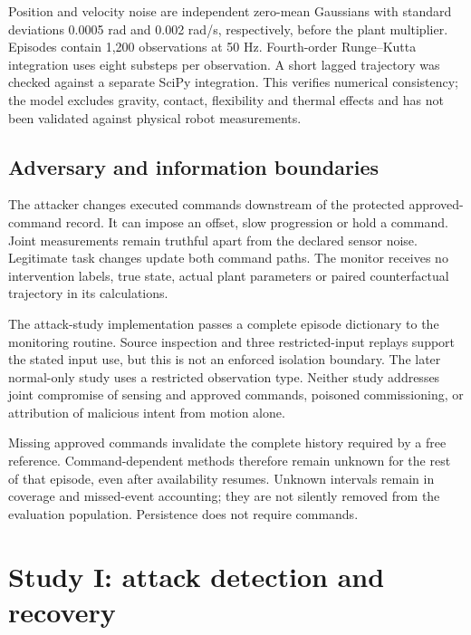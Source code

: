 \documentclass[11pt]{article}
\begin{document}
Position and velocity noise are independent zero-mean Gaussians with standard deviations 0.0005 rad and 0.002 rad/s, respectively, before the plant multiplier. Episodes contain 1,200 observations at 50 Hz. Fourth-order Runge--Kutta integration uses eight substeps per observation. A short lagged trajectory was checked against a separate SciPy integration. This verifies numerical consistency; the model excludes gravity, contact, flexibility and thermal effects and has not been validated against physical robot measurements.

\subsection{Adversary and information boundaries}
The attacker changes executed commands downstream of the protected approved-command record. It can impose an offset, slow progression or hold a command. Joint measurements remain truthful apart from the declared sensor noise. Legitimate task changes update both command paths. The monitor receives no intervention labels, true state, actual plant parameters or paired counterfactual trajectory in its calculations.

The attack-study implementation passes a complete episode dictionary to the monitoring routine. Source inspection and three restricted-input replays support the stated input use, but this is not an enforced isolation boundary. The later normal-only study uses a restricted observation type. Neither study addresses joint compromise of sensing and approved commands, poisoned commissioning, or attribution of malicious intent from motion alone.

Missing approved commands invalidate the complete history required by a free reference. Command-dependent methods therefore remain unknown for the rest of that episode, even after availability resumes. Unknown intervals remain in coverage and missed-event accounting; they are not silently removed from the evaluation population. Persistence does not require commands.

\section{Study I: attack detection and recovery}
\end{document}
